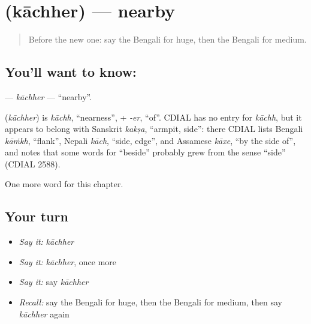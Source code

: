 \section[\texorpdfstring{\bn{কাছের} (kāchher)}{কাছের (kāchher)}]{ (kāchher) — nearby}

\label{lesson:BN-C193-kachher}



\begin{quote}
Before the new one: say the Bengali for huge, then the Bengali for medium.
\end{quote}

\subsection*{You'll want to know: }
\textbf{} — \emph{kāchher} — \textquotedblleft{}nearby\textquotedblright{}.

\begin{cousinweb}
\textbf{} (\emph{kāchher}) is \emph{kāchh}, \textquotedblleft{}nearness\textquotedblright{}, + \emph{-er}, \textquotedblleft{}of\textquotedblright{}. CDIAL has no entry for \emph{kāchh}, but it appears to belong with Sanskrit \emph{kakṣa}, \textquotedblleft{}armpit, side\textquotedblright{}: there CDIAL lists Bengali \emph{kāṁkh}, \textquotedblleft{}flank\textquotedblright{}, Nepali \emph{kāch}, \textquotedblleft{}side, edge\textquotedblright{}, and Assamese \emph{kāxe}, \textquotedblleft{}by the side of\textquotedblright{}, and notes that some words for \textquotedblleft{}beside\textquotedblright{} probably grew from the sense \textquotedblleft{}side\textquotedblright{} (CDIAL 2588).
\end{cousinweb}

\begin{grammarlens}[title={What you've built}]
One more word for this chapter.
\end{grammarlens}

\subsection*{Your turn}
\begin{itemize}
\raggedright
  \item \emph{Say it:} \emph{kāchher}
  \item \emph{Say it:} \emph{kāchher}, once more
  \item \emph{Say it:} say \emph{kāchher}
  \item \emph{Recall:} say the Bengali for huge, then the Bengali for medium, then say \emph{kāchher} again
\end{itemize}

